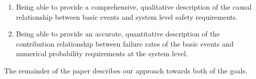 \begin{enumerate}
	\item Being able to provide a comprehensive, qualitative description of the causal relationship between basic events and system level safety requirements.
	\item Being able to provide an accurate, quantitative description of the contribution relationship between failure rates of the basic events and numerical probability requirements at the system level.
\end{enumerate}

The remainder of the paper describes our approach towards both of the goals.




